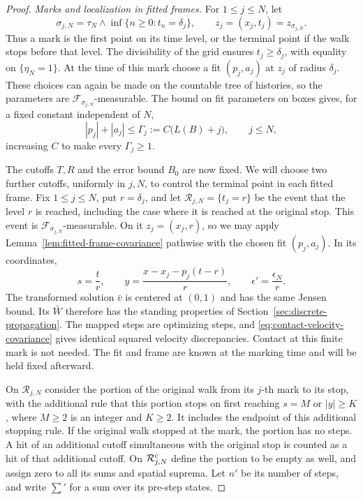 \begin{proof}
\medskip\noindent\emph{Marks and localization in fitted frames.}
For $1\le j\le N$, let
\[
  \sigma_{j,N}=\tau_N\wedge\inf\{n\ge0:t_n=\delta_j\},\qquad
  z_j=(x_j,t_j)=z_{\sigma_{j,N}}.
\]
Thus a mark is the first point on its time level, or the terminal point if
the walk stops before that level.  The divisibility of the grid ensures
$t_j\ge\delta_j$, with equality on $\{\eta_N=1\}$.  At the time of this
mark choose a fit $(p_j,a_j)$ at $z_j$ of radius $\delta_j$.  These choices
can again be made on the countable tree of histories, so the parameters are
$\mathcal F_{\sigma_{j,N}}$-measurable.  The bound on fit parameters on boxes
gives, for a fixed constant independent of $N$,
\[
  |p_j|+|a_j|\le\Gamma_j:=C\bigl(L(B)+j\bigr),\qquad j\le N,
\]
increasing $C$ to make every $\Gamma_j\ge1$.

The cutoffs $T,R$ and the error bound $B_0$ are now fixed.  We will choose
two further cutoffs, uniformly in $j,N$, to control the terminal point in
each fitted frame.  Fix $1\le j\le N$, put $r=\delta_j$, and let
$\mathcal R_{j,N}=\{t_j=r\}$ be the event that the level $r$ is reached,
including the case where it is reached at the original stop.  This event is
$\mathcal F_{\sigma_{j,N}}$-measurable.  On it $z_j=(x_j,r)$, so we may apply
Lemma~\ref{lem:fitted-frame-covariance} pathwise with the chosen fit
$(p_j,a_j)$.  In its coordinates,
\[
  s=\frac{t}{r},\qquad
  y=\frac{x-x_j-p_j(t-r)}{r},\qquad
  \epsilon'=\frac{\epsilon_N}{r}.
\]
The transformed solution $\bar v$ is centered at $(0,1)$ and has the same
Jensen bound.  Its $\bar W$ therefore has the standing properties of
Section~\ref{sec:discrete-propagation}.  The mapped steps are optimizing
steps, and \eqref{eq:contact-velocity-covariance} gives identical squared
velocity discrepancies.  Contact at this finite mark is not needed.  The
fit and frame are known at the marking time and will be held fixed afterward.

On $\mathcal R_{j,N}$ consider the portion of the original walk from its
$j$-th mark to its stop, with the additional rule that this portion stops
on first reaching $s=M$ or $|y|\ge K$, where $M\ge2$ is an integer and
$K\ge2$.  It includes the endpoint of this additional stopping rule.  If
the original walk stopped at the mark, the portion has no steps.  A hit of
an additional cutoff simultaneous with the original stop is counted as a
hit of that additional cutoff.  On $\mathcal R_{j,N}^{\rm c}$ define the
portion to be empty as well, and assign zero to all its sums and spatial
suprema.  Let $n'$ be its number of steps, and write $\sum'$ for a sum over
its pre-step states.


\end{proof}
